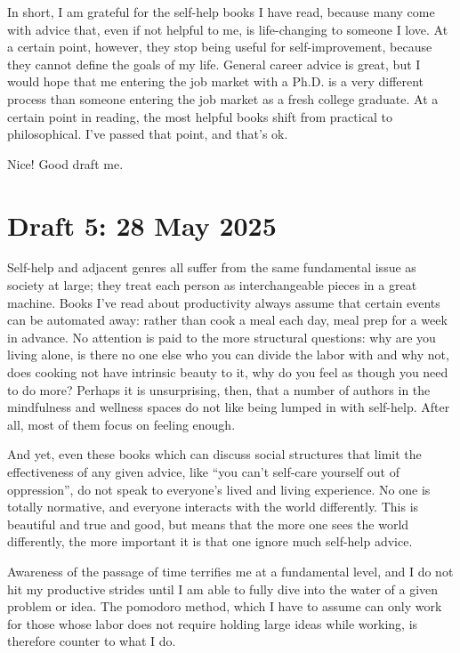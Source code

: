 \documentclass[12pt]{article}
\newcommand{\say}[1]{``#1''}
\renewcommand{\,}{\textsuperscript{,}}
\begin{document}
In short, I am grateful for the self-help books I have read, because many come with advice that, even if not helpful to me, is life-changing to someone I love.  
At a certain point, however, they stop being useful for self-improvement, because they cannot define the goals of my life.  
General career advice is great, but I would hope that me entering the job market with a Ph.D. is a very different process than someone entering the job market as a fresh college graduate.  
At a certain point in reading, the most helpful books shift from practical to philosophical.  
I've passed that point, and that's ok.

Nice! Good draft me.

\section{Draft 5: 28 May 2025}

Self-help and adjacent genres all suffer from the same fundamental issue as society at large; they treat each person as interchangeable pieces in a great machine.  
Books I've read about productivity always assume that certain events can be automated away: rather than cook a meal each day, meal prep for a week in advance.  
No attention is paid to the more structural questions: why are you living alone, is there no one else who you can divide the labor with and why not, does cooking not have intrinsic beauty to it, why do you feel as though you need to do more?  
Perhaps it is unsurprising, then, that a number of authors in the mindfulness and wellness spaces do not like being lumped in with self-help.  
After all, most of them focus on feeling enough.

And yet, even these books which can discuss social structures that limit the effectiveness of any given advice, like \say{you can't self-care yourself out of oppression}, do not speak to everyone's lived and living experience.  
No one is totally normative, and everyone interacts with the world differently.  
This is beautiful and true and good, but means that the more one sees the world differently, the more important it is that one ignore much self-help advice.

Awareness of the passage of time terrifies me at a fundamental level, and I do not hit my productive strides until I am able to fully dive into the water of a given problem or idea.  
The pomodoro method, which I have to assume can only work for those whose labor does not require holding large ideas while working, is therefore counter to what I do.
\end{document}
